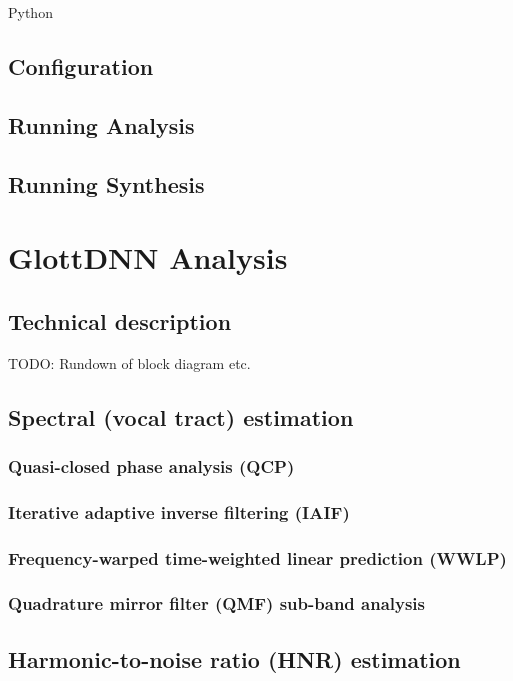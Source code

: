\documentclass[a4paper, 11pt]{article}
\begin{document}
Python


\subsection{Configuration}

\subsection{Running Analysis}

\subsection{Running Synthesis}

\section{GlottDNN Analysis}

\subsection{Technical description}
TODO: Rundown of block diagram etc.

\subsection{Spectral (vocal tract) estimation}

\subsubsection{Quasi-closed phase analysis (QCP)}

\subsubsection{Iterative adaptive inverse filtering (IAIF)}

\subsubsection{Frequency-warped time-weighted linear prediction (WWLP)}

\subsubsection{Quadrature mirror filter (QMF) sub-band analysis}

\subsection{Harmonic-to-noise ratio (HNR) estimation}
\end{document}
